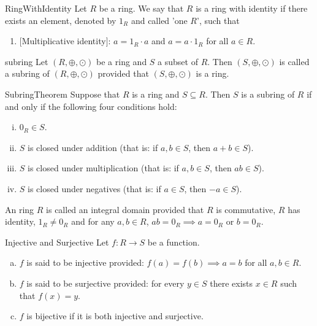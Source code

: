 \begin{defn}{RingWithIdentity}
	Let $R$ be a ring. We say that $R$ is a ring with identity if there exists an element,
	denoted by $1_R$ and called 'one $R$', such that
	\begin{enumerate}[(10)]
		\item $[$Multiplicative identity$]$: $a=1_R\cdot a$ and $a=a\cdot 1_R$ for all $a \in R$.
	\end{enumerate}
\end{defn}
\begin{defn}[Subring]{subring}
	Let $(R, \oplus, \odot)$ be a ring and $S$ a subset of $R$. Then $(S, \oplus, \odot)$ is called a subring of	$(R, \oplus, \odot)$ provided that $(S, \oplus, \odot)$ is a ring.
\end{defn}
\begin{theo}{SubringTheorem}
	Suppose that $R$ is a ring and $S \subseteq R$. Then $S$ is a subring of $R$ if and only if the following four conditions hold:
	\begin{enumerate}[(i)]
		\item $0_R \in S$.
		\item $S$ is closed under addition (that is: if $a, b \in S$, then $a + b \in S$).
		\item $S$ is closed under multiplication (that is: if $a, b \in S$, then $ab \in S$).
		\item $S$ is closed under negatives (that is: if $a \in S$, then $-a \in S$).
	\end{enumerate}
\end{theo}
\begin{defn}{1}
	An ring $R$ is called an integral domain provided that $R$ is commutative, $R$ has identity, $1_R \neq 0_R$ and for any $a,b \in R$, $ab=0_R \implies a=0_R$ or $b=0_R$.
\end{defn}
\begin{defn}{Injective and Surjective}
	Let $f:R\rightarrow S$ be a function.
	\begin{enumerate}[(a)]
		\item $f$ is said to be injective provided: $f(a)=f(b)\implies a=b$ for all $a,b \in R$.
		\item $f$ is said to be surjective provided: for every $y \in S$ there exists $x \in R$ such that $f(x)=y$.
		\item $f$ is bijective if it is both injective and surjective.
	\end{enumerate}
\end{defn}
